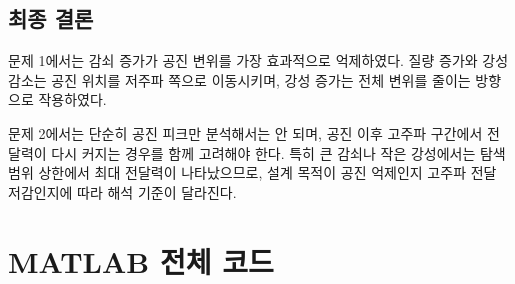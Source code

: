 \documentclass[12pt, a4paper]{article}
\begin{document}
\subsection{최종 결론}

문제 1에서는 감쇠 증가가 공진 변위를 가장 효과적으로 억제하였다.
질량 증가와 강성 감소는 공진 위치를 저주파 쪽으로 이동시키며, 강성 증가는 전체 변위를 줄이는 방향으로 작용하였다.

문제 2에서는 단순히 공진 피크만 분석해서는 안 되며, 공진 이후 고주파 구간에서 전달력이 다시 커지는 경우를 함께 고려해야 한다.
특히 큰 감쇠나 작은 강성에서는 탐색 범위 상한에서 최대 전달력이 나타났으므로, 설계 목적이 공진 억제인지 고주파 전달 저감인지에 따라 해석 기준이 달라진다.

\appendix
\section{MATLAB 전체 코드}
\end{document}
